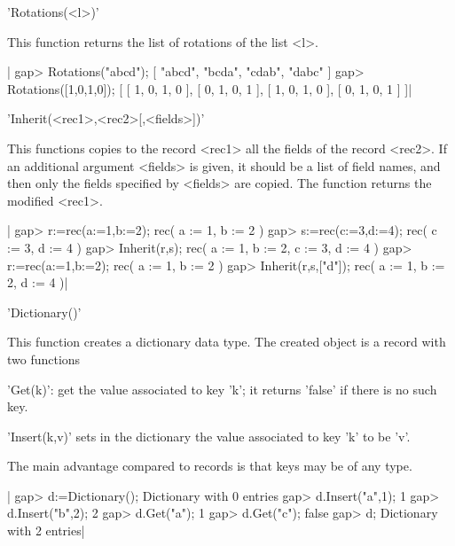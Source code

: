 %
%

'Rotations(<l>)'

This function returns the list of rotations of the list <l>.

|    gap> Rotations("abcd");
    [ "abcd", "bcda", "cdab", "dabc" ]
    gap> Rotations([1,0,1,0]);
    [ [ 1, 0, 1, 0 ], [ 0, 1, 0, 1 ], [ 1, 0, 1, 0 ], [ 0, 1, 0, 1 ] ]|

%
%

'Inherit(<rec1>,<rec2>[,<fields>])'

This  functions copies to  the record <rec1>  all the fields  of the record
<rec2>. If an additional argument <fields> is given, it should be a list of
field names, and then only the fields specified by <fields> are copied. The
function returns the modified <rec1>.

|    gap> r:=rec(a:=1,b:=2);
    rec(
      a := 1,
      b := 2 )
    gap> s:=rec(c:=3,d:=4);
    rec(
      c := 3,
      d := 4 )
    gap> Inherit(r,s);
    rec(
      a := 1,
      b := 2,
      c := 3,
      d := 4 )
    gap> r:=rec(a:=1,b:=2);
    rec(
      a := 1,
      b := 2 )
    gap> Inherit(r,s,["d"]);
    rec(
      a := 1,
      b := 2,
      d := 4 )|

%
%

'Dictionary()'

This  function  creates  a  dictionary  data  type. The created object is a
record  with two functions\:

'Get(k)':  get the value associated to key 'k'; it returns 'false' if there
is no such key.

'Insert(k,v)'  sets in the dictionary the value associated to key 'k' to be
'v'.

The main advantage compared to records is that keys may be of any type.

|    gap> d:=Dictionary();
    Dictionary with 0 entries
    gap> d.Insert("a",1);
    1
    gap> d.Insert("b",2);
    2
    gap> d.Get("a");
    1
    gap> d.Get("c");
    false
    gap> d;
    Dictionary with 2 entries|

%
%


